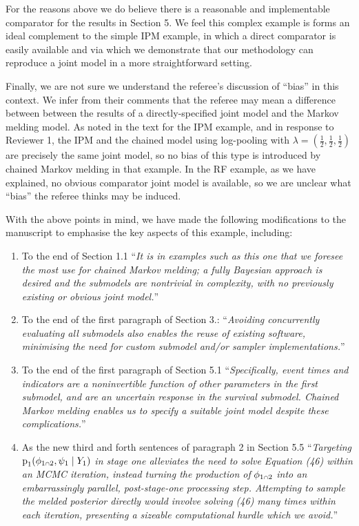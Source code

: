 \documentclass[
  10pt,
  a4paper,
]{article}
\providecommand{\tightlist}{%
  \setlength{\itemsep}{0pt}\setlength{\parskip}{0pt}}
\let\Oldcap\cap
\renewcommand{\cap}{\mathrel{\mathsmaller{\Oldcap}}}
\newcommand{\pd}{\text{p}}
\begin{document}
For the reasons above we do believe there is a reasonable and
implementable comparator for the results in Section 5. We feel this
complex example is forms an ideal complement to the simple IPM example,
in which a direct comparator is easily available and via which we
demonstrate that our methodology can reproduce a joint model in a more
straightforward setting.

Finally, we are not sure we understand the referee's discussion of
``bias'' in this context. We infer from their comments that the referee
may mean a difference between between the results of a
directly-specified joint model and the Markov melding model. As noted in
the text for the IPM example, and in response to Reviewer 1, the IPM and
the chained model using log-pooling with
\(\lambda = (\frac{1}{2}, \frac{1}{2}, \frac{1}{2})\) are precisely the
same joint model, so no bias of this type is introduced by chained
Markov melding in that example. In the RF example, as we have explained,
no obvious comparator joint model is available, so we are unclear what
``bias'' the referee thinks may be induced.

With the above points in mind, we have made the following modifications
to the manuscript to emphasise the key aspects of this example,
including:

\begin{enumerate}
\def\labelenumi{\arabic{enumi}.}
\tightlist
\item
  To the end of Section 1.1 ``\emph{It is in examples such as this one
  that we foresee the most use for chained Markov melding; a fully
  Bayesian approach is desired and the submodels are nontrivial in
  complexity, with no previously existing or obvious joint model.}''
\item
  To the end of the first paragraph of Section 3.: ``\emph{Avoiding
  concurrently evaluating all submodels also enables the reuse of
  existing software, minimising the need for custom submodel and/or
  sampler implementations.}''
\item
  To the end of the first paragraph of Section 5.1 ``\emph{Specifically,
  event times and indicators are a noninvertible function of other
  parameters in the first submodel, and are an uncertain response in the
  survival submodel. Chained Markov melding enables us to specify a
  suitable joint model despite these complications.}''
\item
  As the new third and forth sentences of paragraph 2 in Section 5.5
  ``\emph{Targeting} \(\pd_{1}(\phi_{1 \cap 2}, \psi_{1} \mid Y_{1})\)
  \emph{in stage one alleviates the need to solve Equation (46) within
  an MCMC iteration, instead turning the production of}
  \(\phi_{1 \cap 2}\) \emph{into an embarrassingly parallel,
  post-stage-one processing step. Attempting to sample the melded
  posterior directly would involve solving (46) many times within each
  iteration, presenting a sizeable computational hurdle which we
  avoid.}''
\end{enumerate}
\end{document}
